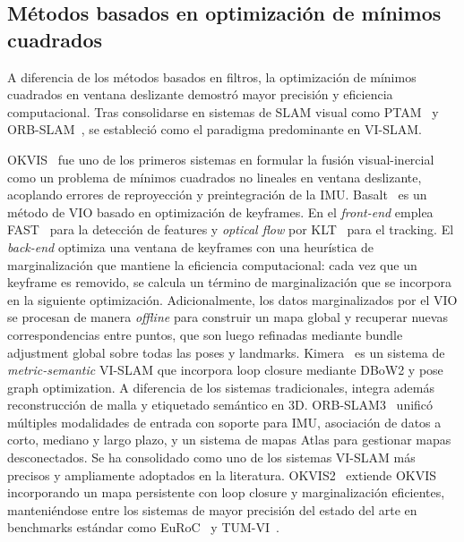 \subsection{Métodos basados en optimización de mínimos cuadrados}

A diferencia de los métodos basados en filtros, la optimización de mínimos cuadrados en ventana deslizante demostró mayor precisión y eficiencia computacional. Tras consolidarse en sistemas de SLAM visual como PTAM~\cite{klein2007ptam} y ORB-SLAM~\cite{mur2015orbslam}, se estableció como el paradigma predominante en VI-SLAM.

OKVIS~\cite{leutenegger2015okvis} fue uno de los primeros sistemas en formular la fusión visual-inercial como un problema de mínimos cuadrados no lineales en ventana deslizante, acoplando errores de reproyección y preintegración de la IMU.
Basalt~\cite{usenko2020basalt} es un método de VIO basado en optimización de keyframes. En el \textit{front-end} emplea FAST~\cite{rosten2006fast} para la detección de features y \textit{optical flow} por KLT~\cite{lucas1981klt} para el tracking. El \textit{back-end} optimiza una ventana de keyframes con una heurística de marginalización que mantiene la eficiencia computacional: cada vez que un keyframe es removido, se calcula un término de marginalización que se incorpora en la siguiente optimización. Adicionalmente, los datos marginalizados por el VIO se procesan de manera \textit{offline} para construir un mapa global y recuperar nuevas correspondencias entre puntos, que son luego refinadas mediante bundle adjustment global sobre todas las poses y landmarks.
Kimera~\cite{rosinol2020kimera} es un sistema de \textit{metric-semantic} VI-SLAM que incorpora loop closure mediante DBoW2 y pose graph optimization. A diferencia de los sistemas tradicionales, integra además reconstrucción de malla y etiquetado semántico en 3D.
ORB-SLAM3~\cite{campos2021orbslam3} unificó múltiples modalidades de entrada con soporte para IMU, asociación de datos a corto, mediano y largo plazo, y un sistema de mapas Atlas para gestionar mapas desconectados. Se ha consolidado como uno de los sistemas VI-SLAM más precisos y ampliamente adoptados en la literatura.
OKVIS2~\cite{leutenegger2022okvis2} extiende OKVIS incorporando un mapa persistente con loop closure y marginalización eficientes, manteniéndose entre los sistemas de mayor precisión del estado del arte en benchmarks estándar como EuRoC~\cite{burri2016euroc} y TUM-VI~\cite{schubert2018tum}.
